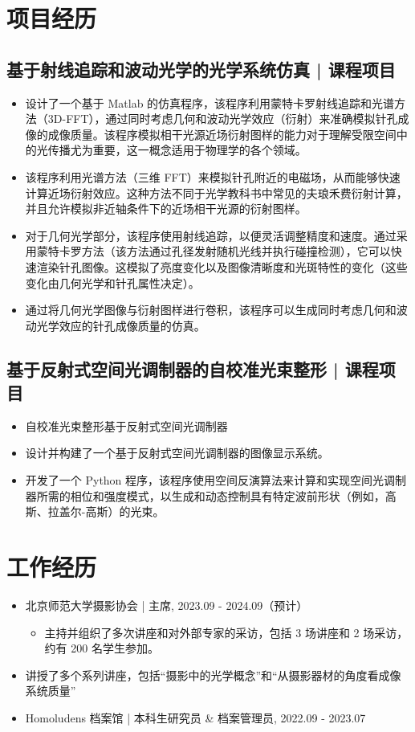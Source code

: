 \documentclass{article}
\begin{document}
\section*{项目经历}
\subsection*{基于射线追踪和波动光学的光学系统仿真 | 课程项目}
\begin{itemize}
    \item 设计了一个基于 Matlab 的仿真程序，该程序利用蒙特卡罗射线追踪和光谱方法（3D-FFT），通过同时考虑几何和波动光学效应（衍射）来准确模拟针孔成像的成像质量。该程序模拟相干光源近场衍射图样的能力对于理解受限空间中的光传播尤为重要，这一概念适用于物理学的各个领域。
    \item 该程序利用光谱方法（三维 FFT）来模拟针孔附近的电磁场，从而能够快速计算近场衍射效应。这种方法不同于光学教科书中常见的夫琅禾费衍射计算，并且允许模拟非近轴条件下的近场相干光源的衍射图样。
    \item 对于几何光学部分，该程序使用射线追踪，以便灵活调整精度和速度。通过采用蒙特卡罗方法（该方法通过孔径发射随机光线并执行碰撞检测），它可以快速渲染针孔图像。这模拟了亮度变化以及图像清晰度和光斑特性的变化（这些变化由几何光学和针孔属性决定）。
    \item 通过将几何光学图像与衍射图样进行卷积，该程序可以生成同时考虑几何和波动光学效应的针孔成像质量的仿真。
\end{itemize}

\subsection*{基于反射式空间光调制器的自校准光束整形 | 课程项目}
\begin{itemize}
    \item 自校准光束整形基于反射式空间光调制器
    \item 设计并构建了一个基于反射式空间光调制器的图像显示系统。
    \item 开发了一个 Python 程序，该程序使用空间反演算法来计算和实现空间光调制器所需的相位和强度模式，以生成和动态控制具有特定波前形状（例如，高斯、拉盖尔-高斯）的光束。
\end{itemize}

\section*{工作经历}
\begin{itemize}
    \item 北京师范大学摄影协会 | 主席, 2023.09 - 2024.09（预计）
    \begin{itemize}
        \item 主持并组织了多次讲座和对外部专家的采访，包括 3 场讲座和 2 场采访，约有 200 名学生参加。
    \end{itemize}
    \item 讲授了多个系列讲座，包括“摄影中的光学概念”和“从摄影器材的角度看成像系统质量”
    \item Homoludens 档案馆 | 本科生研究员 \& 档案管理员, 2022.09 - 2023.07
\end{itemize}
\end{document}
